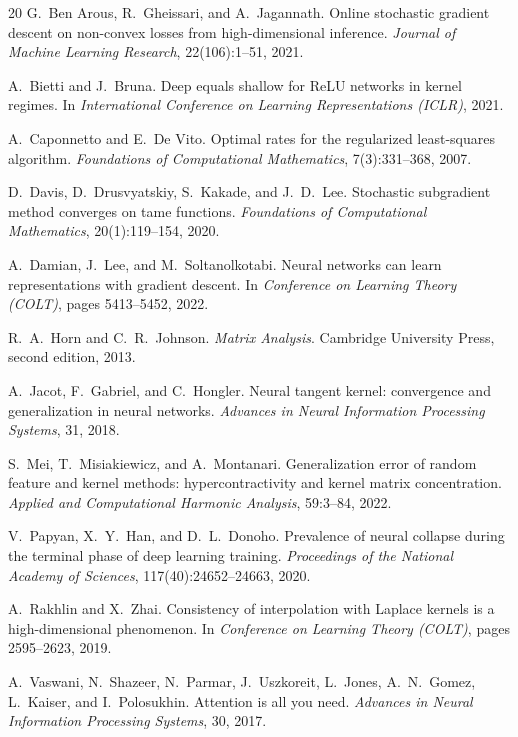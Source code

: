 \documentclass[12pt]{amsart}
\theoremstyle{definition}
\theoremstyle{remark}
\begin{document}
\begin{thebibliography}{20}
G.~Ben Arous, R.~Gheissari, and A.~Jagannath.
\newblock Online stochastic gradient descent on non-convex losses from
  high-dimensional inference.
\newblock \emph{Journal of Machine Learning Research}, 22(106):1--51,
  2021.

A.~Bietti and J.~Bruna.
\newblock Deep equals shallow for ReLU networks in kernel regimes.
\newblock In \emph{International Conference on Learning Representations
  (ICLR)}, 2021.

A.~Caponnetto and E.~De Vito.
\newblock Optimal rates for the regularized least-squares algorithm.
\newblock \emph{Foundations of Computational Mathematics}, 7(3):331--368,
  2007.

D.~Davis, D.~Drusvyatskiy, S.~Kakade, and J.~D.~Lee.
\newblock Stochastic subgradient method converges on tame functions.
\newblock \emph{Foundations of Computational Mathematics}, 20(1):119--154,
  2020.

A.~Damian, J.~Lee, and M.~Soltanolkotabi.
\newblock Neural networks can learn representations with gradient
  descent.
\newblock In \emph{Conference on Learning Theory (COLT)}, pages
  5413--5452, 2022.

R.~A.~Horn and C.~R.~Johnson.
\newblock \emph{Matrix Analysis}.
\newblock Cambridge University Press, second edition, 2013.

A.~Jacot, F.~Gabriel, and C.~Hongler.
\newblock Neural tangent kernel: convergence and generalization in
  neural networks.
\newblock \emph{Advances in Neural Information Processing Systems}, 31,
  2018.

S.~Mei, T.~Misiakiewicz, and A.~Montanari.
\newblock Generalization error of random feature and kernel methods:
  hypercontractivity and kernel matrix concentration.
\newblock \emph{Applied and Computational Harmonic Analysis},
  59:3--84, 2022.

V.~Papyan, X.~Y.~Han, and D.~L.~Donoho.
\newblock Prevalence of neural collapse during the terminal phase of
  deep learning training.
\newblock \emph{Proceedings of the National Academy of Sciences},
  117(40):24652--24663, 2020.

A.~Rakhlin and X.~Zhai.
\newblock Consistency of interpolation with Laplace kernels is a
  high-dimensional phenomenon.
\newblock In \emph{Conference on Learning Theory (COLT)}, pages
  2595--2623, 2019.

A.~Vaswani, N.~Shazeer, N.~Parmar, J.~Uszkoreit, L.~Jones, A.~N.~Gomez,
  L.~Kaiser, and I.~Polosukhin.
\newblock Attention is all you need.
\newblock \emph{Advances in Neural Information Processing Systems}, 30,
  2017.

\end{thebibliography}
\end{document}
